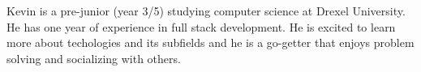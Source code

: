 

\begin{cvparagraph}

    Kevin is a pre-junior (year 3/5) studying computer science at Drexel University. He has one year of experience in full stack development.
    He is excited to learn more about techologies and its subfields and he is a go-getter that enjoys problem solving and socializing with others.
\end{cvparagraph}

